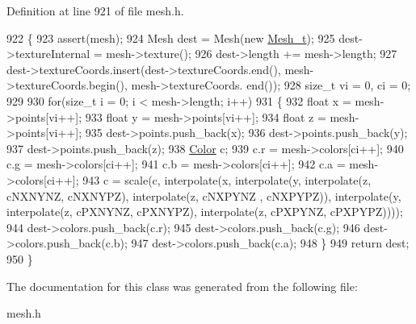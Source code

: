 Definition at line 921 of file mesh.\+h.


\begin{DoxyCode}
922 \{
923     assert(mesh);
924     Mesh dest = Mesh(\textcolor{keyword}{new} \hyperlink{classMesh__t}{Mesh\_t});
925     dest->textureInternal = mesh->texture();
926     dest->length += mesh->length;
927     dest->textureCoords.insert(dest->textureCoords.end(), mesh->textureCoords.begin(), mesh->textureCoords.
      end());
928     \textcolor{keywordtype}{size\_t} vi = 0, ci = 0;
929 
930     \textcolor{keywordflow}{for}(\textcolor{keywordtype}{size\_t} i = 0; i < mesh->length; i++)
931     \{
932         \textcolor{keywordtype}{float} x = mesh->points[vi++];
933         \textcolor{keywordtype}{float} y = mesh->points[vi++];
934         \textcolor{keywordtype}{float} z = mesh->points[vi++];
935         dest->points.push\_back(x);
936         dest->points.push\_back(y);
937         dest->points.push\_back(z);
938         \hyperlink{structColor}{Color} c;
939         c.r = mesh->colors[ci++];
940         c.g = mesh->colors[ci++];
941         c.b = mesh->colors[ci++];
942         c.a = mesh->colors[ci++];
943         c = scale(c, interpolate(x, interpolate(y, interpolate(z, cNXNYNZ, cNXNYPZ), interpolate(z, cNXPYNZ
      , cNXPYPZ)), interpolate(y, interpolate(z, cPXNYNZ, cPXNYPZ), interpolate(z, cPXPYNZ, cPXPYPZ))));
944         dest->colors.push\_back(c.r);
945         dest->colors.push\_back(c.g);
946         dest->colors.push\_back(c.b);
947         dest->colors.push\_back(c.a);
948     \}
949     \textcolor{keywordflow}{return} dest;
950 \}
\end{DoxyCode}


The documentation for this class was generated from the following file\+:\begin{DoxyCompactItemize}
\item 
mesh.\+h\end{DoxyCompactItemize}
